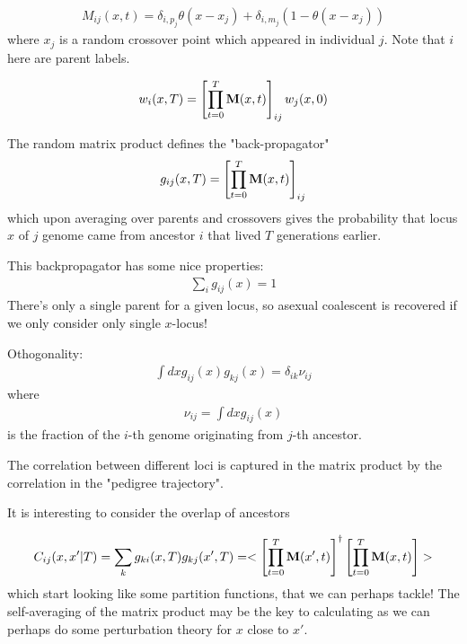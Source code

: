 \documentclass{article}
\begin{document}
\begin{eqnarray}
M_{ij}(x,t)=\delta_{i,p_j}\theta(x-x_j)+\delta_{i,m_j}(1-\theta(x-x_j))
\end{eqnarray}
where $x_j$ is a random crossover point which appeared in individual $j$. Note that $i$ here are parent labels.

\begin{eqnarray}
w_{i}(x,T)=\left [ \prod_{t=0}^T {\bf M} (x,t) \right ]_{ij} w_j(x,0)
\end{eqnarray}

The random matrix product defines the "back-propagator"
\begin{eqnarray}
g_{ij}(x,T)=\left [ \prod_{t=0}^T {\bf M} (x,t) \right ]_{ij} 
\end{eqnarray}
which upon averaging over parents and crossovers gives the probability that locus $x$ of $j$ genome came from ancestor $i$ that lived $T$ generations earlier.

This backpropagator has some nice properties:
\begin{eqnarray}
\sum_i g_{ij}(x)=1
\end{eqnarray}
There's only a single parent for a given locus, so asexual coalescent is recovered if we only consider only single $x$-locus! 

Othogonality:
\begin{eqnarray}
\int dx g_{ij}(x)g_{kj}(x)=\delta_{ik}\nu_{ij}
\end{eqnarray}
where
\begin{eqnarray}
\nu_{ij}=\int dx g_{ij}(x)
\end{eqnarray}
is the fraction of the $i$-th genome originating from $j$-th ancestor.

The correlation between different loci is captured in the matrix product by the correlation in the "pedigree trajectory".

It is interesting to consider the overlap of ancestors

\begin{eqnarray}
C_{ij}(x,x'|T)=\sum_{k} g_{ki}(x,T)g_{kj}(x',T)=<\left [ \prod_{t=0}^T {\bf M} (x',t) \right ]^{\dagger} \left [ \prod_{t=0}^T {\bf M} (x,t) \right ]>
\end{eqnarray}
which start looking like some partition functions, that we can perhaps tackle! The self-averaging of the matrix product may be the key to calculating as we can perhaps do some perturbation theory for $x$ close to $x'$.
\end{document}
